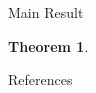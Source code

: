 \documentclass[final,noamsthm]{beamer}
\newtheorem{thm}{Theorem}
\newlength{\sepwidth}
\newlength{\colwidth}
\newcommand{\separatorcolumn}{\begin{column}{\sepwidth}\end{column}}
\begin{document}
\begin{frame}[t]
\begin{columns}[t]
\begin{column}{\colwidth}
\begin{block}{Main Result}
\begin{thm}
                \end{thm}
            \end{block}

            \begin{block}{References}
                \vspace{-0.3em}
                {
                    \tiny
                    \nocite{*}
                    \begin{multicols}{2}
                        
                        
                \end{multicols}}
            \end{block}
        \end{column}
        \separatorcolumn
    \end{columns}
\end{frame}
\end{document}
